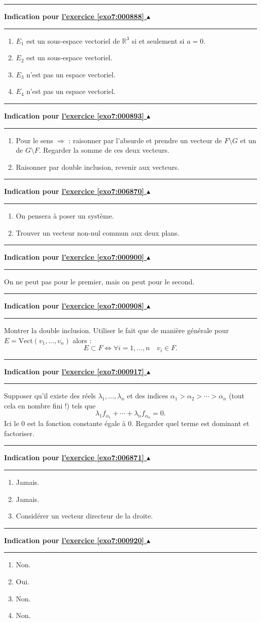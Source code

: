 \documentclass[11pt,a4paper]{article}
\newcommand{\Rr}{\mathbb{R}} \newcommand{\R}{\mathbb{R}}
\newcounter{exo}
\newcommand{\indication}[1]{\hypertarget{ind7:#1}{}\label{ind7:#1}{\bf Indication pour \hyperlink{exo7:#1}{l'exercice \ref{exo7:#1} $\blacktriangle$}}\vspace{1mm}\hrule\vspace{1mm}}
\newcommand{\finindication}{\vspace{1mm}\hrule\vspace*{7mm}}
\begin{document}
\finindication
\indication{000888}
\begin{enumerate}
\item $E_1$ est un sous-espace vectoriel de $\Rr^3$ si et seulement si
  $a=0$.
\item $E_2$ est un sous-espace vectoriel.
\item $E_3$ n'est pas un espace vectoriel.
\item $E_4$ n'est pas un espace vectoriel.
\end{enumerate}
\finindication
\indication{000893}
\begin{enumerate}
\item Pour le sens $\Rightarrow$ : raisonner par l'absurde et prendre
  un vecteur de $F\setminus G$ et un de $G\setminus F$. Regarder la
  somme de ces deux vecteurs.
\item Raisonner par double inclusion, revenir aux vecteurs.
\end{enumerate}
\finindication
\indication{006870}
\begin{enumerate}
  \item On pensera \`a poser un syst\`eme.
  \item Trouver un vecteur non-nul commun aux deux plans.
\end{enumerate}
\finindication
\indication{000900}
On ne peut pas pour le premier, mais on peut pour le second.
\finindication
\indication{000908}
Montrer la double inclusion. 
Utiliser le fait que de mani\`ere g\'en\'erale pour  $E=\mathrm{Vect}(v_1,\ldots,v_n)$
alors : 
$$E\subset F \iff \forall i=1,\ldots,n \quad v_i\in F.$$
\finindication
\indication{000917}
Supposer qu'il existe des r\'eels $\lambda_1,\ldots, \lambda_n$
et des indices  $\alpha_1 > \alpha_2 > \cdots > \alpha_n$ (tout cela en nombre fini !)
tels que 
$$\lambda_1f_{\alpha_1}+\cdots+\lambda_nf_{\alpha_n} = 0.$$
Ici le $0$ est la fonction constante \'egale \`a $0$. 
Regarder quel terme est dominant et factoriser.
\finindication
\indication{006871}
\begin{enumerate}
  \item Jamais.
  \item Jamais.
  \item Considérer un vecteur directeur de la droite.
\end{enumerate}
\finindication
\indication{000920}
\begin{enumerate}
\item Non.
\item Oui.
\item Non.
\item Non. 
\end{enumerate}
\end{document}
